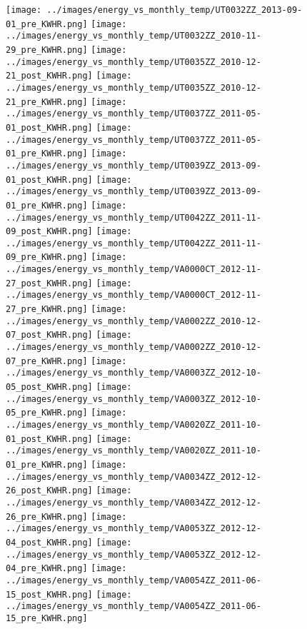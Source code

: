 \clearpage
\begin{figure}
\centering
\texttt{[image: ../images/energy\_vs\_monthly\_temp/UT0032ZZ\_2013-09-01\_pre\_KWHR.png]}
\texttt{[image: ../images/energy\_vs\_monthly\_temp/UT0032ZZ\_2010-11-29\_pre\_KWHR.png]}
\texttt{[image: ../images/energy\_vs\_monthly\_temp/UT0035ZZ\_2010-12-21\_post\_KWHR.png]}
\texttt{[image: ../images/energy\_vs\_monthly\_temp/UT0035ZZ\_2010-12-21\_pre\_KWHR.png]}
\texttt{[image: ../images/energy\_vs\_monthly\_temp/UT0037ZZ\_2011-05-01\_post\_KWHR.png]}
\texttt{[image: ../images/energy\_vs\_monthly\_temp/UT0037ZZ\_2011-05-01\_pre\_KWHR.png]}
\texttt{[image: ../images/energy\_vs\_monthly\_temp/UT0039ZZ\_2013-09-01\_post\_KWHR.png]}
\texttt{[image: ../images/energy\_vs\_monthly\_temp/UT0039ZZ\_2013-09-01\_pre\_KWHR.png]}
\texttt{[image: ../images/energy\_vs\_monthly\_temp/UT0042ZZ\_2011-11-09\_post\_KWHR.png]}
\texttt{[image: ../images/energy\_vs\_monthly\_temp/UT0042ZZ\_2011-11-09\_pre\_KWHR.png]}
\texttt{[image: ../images/energy\_vs\_monthly\_temp/VA0000CT\_2012-11-27\_post\_KWHR.png]}
\texttt{[image: ../images/energy\_vs\_monthly\_temp/VA0000CT\_2012-11-27\_pre\_KWHR.png]}
\texttt{[image: ../images/energy\_vs\_monthly\_temp/VA0002ZZ\_2010-12-07\_post\_KWHR.png]}
\texttt{[image: ../images/energy\_vs\_monthly\_temp/VA0002ZZ\_2010-12-07\_pre\_KWHR.png]}
\texttt{[image: ../images/energy\_vs\_monthly\_temp/VA0003ZZ\_2012-10-05\_post\_KWHR.png]}
\texttt{[image: ../images/energy\_vs\_monthly\_temp/VA0003ZZ\_2012-10-05\_pre\_KWHR.png]}
\texttt{[image: ../images/energy\_vs\_monthly\_temp/VA0020ZZ\_2011-10-01\_post\_KWHR.png]}
\texttt{[image: ../images/energy\_vs\_monthly\_temp/VA0020ZZ\_2011-10-01\_pre\_KWHR.png]}
\texttt{[image: ../images/energy\_vs\_monthly\_temp/VA0034ZZ\_2012-12-26\_post\_KWHR.png]}
\texttt{[image: ../images/energy\_vs\_monthly\_temp/VA0034ZZ\_2012-12-26\_pre\_KWHR.png]}
\texttt{[image: ../images/energy\_vs\_monthly\_temp/VA0053ZZ\_2012-12-04\_post\_KWHR.png]}
\texttt{[image: ../images/energy\_vs\_monthly\_temp/VA0053ZZ\_2012-12-04\_pre\_KWHR.png]}
\texttt{[image: ../images/energy\_vs\_monthly\_temp/VA0054ZZ\_2011-06-15\_post\_KWHR.png]}
\texttt{[image: ../images/energy\_vs\_monthly\_temp/VA0054ZZ\_2011-06-15\_pre\_KWHR.png]}
\end{figure}
